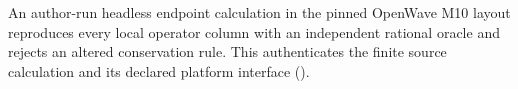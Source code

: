 An author-run headless endpoint calculation in the pinned OpenWave M10
layout reproduces every local operator column with an independent rational
oracle and rejects an altered conservation rule. This authenticates the
finite source calculation and its declared platform interface
().
